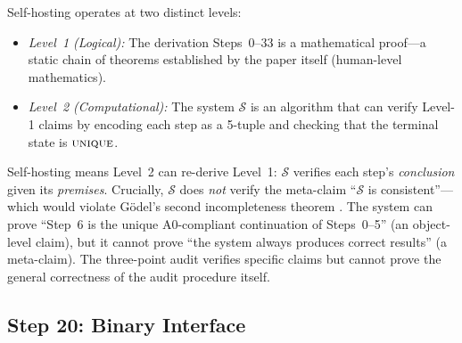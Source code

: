 \begin{remark}
\label{app:rem:self-hosting-godel}
Self-hosting operates at two distinct levels:
\begin{itemize}[nosep]
  \item \emph{Level~1 (Logical):} The derivation Steps~0--33 is a
        mathematical proof---a static chain of theorems established by
        the paper itself (human-level mathematics).
  \item \emph{Level~2 (Computational):} The system $\mathcal{S}$ is an
        algorithm that can verify Level-1 claims by encoding each step as
        a 5-tuple and checking that the terminal state is $\textsc{unique}$.
\end{itemize}
Self-hosting means Level~2 can re-derive Level~1: $\mathcal{S}$ verifies
each step's \emph{conclusion} given its \emph{premises}.  Crucially,
$\mathcal{S}$ does \emph{not} verify the meta-claim ``$\mathcal{S}$ is
consistent''---which would violate G\"{o}del's second incompleteness
theorem \citep{godel1931}.  The system can prove ``Step~6 is the unique A0-compliant
continuation of Steps~0--5'' (an object-level claim), but it cannot prove
``the system always produces correct results'' (a meta-claim).  The
three-point audit verifies specific claims but cannot prove the general
correctness of the audit procedure itself.
\end{remark}


\subsection{Step 20: Binary Interface}\label{app:step20}

